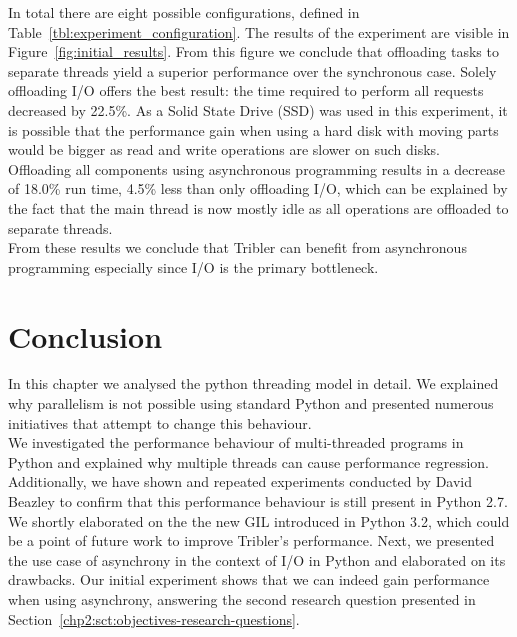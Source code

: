 In total there are eight possible configurations, defined in Table~\ref{tbl:experiment_configuration}.
The results of the experiment are visible in Figure~\ref{fig:initial_results}.
From this figure we conclude that offloading tasks to separate threads yield a superior performance over the synchronous case. Solely offloading I/O offers the best result: the time required to perform all requests decreased by 22.5\%.
As a Solid State Drive (SSD) was used in this experiment, it is possible that the performance gain when using a hard disk with moving parts would be bigger as read and write operations are slower on such disks.\\
Offloading all components using asynchronous programming results in a decrease of 18.0\% run time, 4.5\% less than only offloading I/O, which can be explained by the fact that the main thread is now mostly idle as all operations are offloaded to separate threads.\\
From these results we conclude that Tribler can benefit from asynchronous programming especially since I/O is the primary bottleneck.

\section{Conclusion}

In this chapter we analysed the python threading model in detail.
We explained why parallelism is not possible using standard Python and presented numerous initiatives that attempt to change this behaviour.\\
We investigated the performance behaviour of multi-threaded programs in Python and explained why multiple threads can cause performance regression.
Additionally, we have shown and repeated experiments conducted by David Beazley to confirm that this performance behaviour is still present in Python 2.7.\\
We shortly elaborated on the the new GIL introduced in Python 3.2, which could be a point of future work to improve Tribler's performance.
Next, we presented the use case of asynchrony in the context of I/O in Python and elaborated on its drawbacks.
Our initial experiment shows that we can indeed gain performance when using asynchrony, answering the second research question presented in Section~\ref{chp2:sct:objectives-research-questions}.
